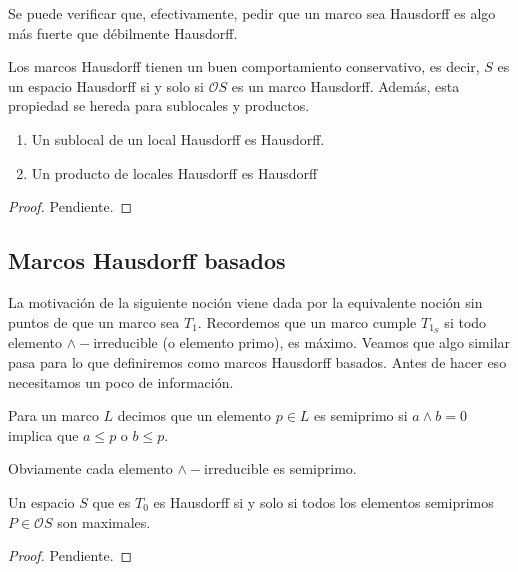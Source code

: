 Se puede verificar que, efectivamente, pedir que un marco sea Hausdorff es algo más fuerte que débilmente Hausdorff.\\

\begin{obs}\label{Observacion3.4.1}
Los marcos Hausdorff tienen un buen comportamiento conservativo, es decir, $S$ es un espacio Hausdorff si y solo si $\mathcal{O}S$ es un marco Hausdorff. Además, esta propiedad se hereda para sublocales y productos.
\end{obs}

\begin{prop}\label{Heredar H}
    \begin{enumerate}
        \item Un sublocal de un local Hausdorff es Hausdorff.
        \item Un producto de locales Hausdorff es Hausdorff
    \end{enumerate}
\end{prop}

\begin{proof}
    Pendiente.
\end{proof}

\subsection{Marcos Hausdorff basados}

La motivación de la siguiente noción viene dada por la equivalente noción sin puntos de que un marco sea $T_1$. Recordemos que un marco cumple $T_{1_S}$ si todo elemento $\wedge-$irreducible (o elemento primo), es máximo. Veamos que algo similar pasa para lo que definiremos como marcos Hausdorff basados. Antes de hacer eso necesitamos un poco de información.

\begin{dfn}\label{Semiprimo}
    Para un marco $L$ decimos que un elemento $p\in L$ es semiprimo si $a\wedge b=0$ implica que $a\leq p$ o $b\leq p$.
\end{dfn}

Obviamente cada elemento $\wedge-$irreducible es semiprimo. 

\begin{prop}\label{Proposicion4.1.1}
    Un espacio $S$ que es $T_0$ es Hausdorff si y solo si todos los elementos semiprimos $P\in \mathcal{O}S$ son maximales.
\end{prop}

\begin{proof}
    Pendiente.
\end{proof}

